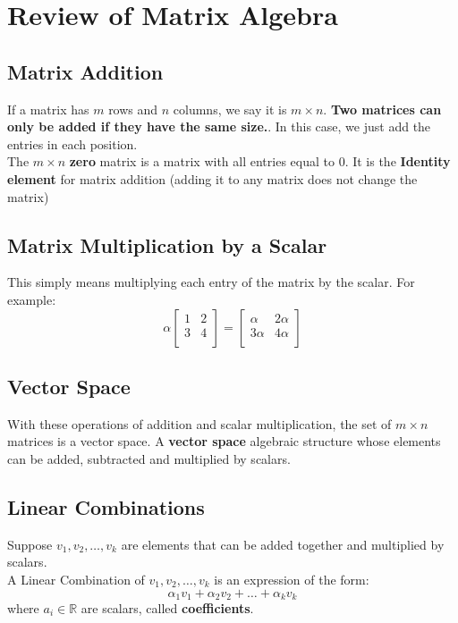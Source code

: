 \documentclass[a4paper, 9pt]{extarticle}
\begin{document}
\pagebreak
\footnotesize
\tableofcontents
\pagebreak
\normalsize
\section{Review of Matrix Algebra}
\subsection*{Matrix Addition}
If a matrix has $m$ rows and $n$ columns, we say it is $m \times n$. \textbf{Two matrices can only be added if they have the same size.}. In this case, we just add the entries in each position. \\[1.5ex]
The $m \times n$ \textbf{zero} matrix is a matrix with all entries equal to $0$. It is the \textbf{Identity element} for matrix addition (adding it to any matrix does not change the matrix)
\subsection*{Matrix Multiplication by a Scalar}
This simply means multiplying each entry of the matrix by the scalar. For example:
$$
  \alpha \begin{bmatrix}
    1 & 2 \\
    3 & 4 \\
  \end{bmatrix}
  =
  \begin{bmatrix}
    \alpha  & 2\alpha \\
    3\alpha & 4\alpha \\
  \end{bmatrix}
$$
\subsection*{Vector Space}
With these operations of addition and scalar multiplication, the set of
$m \times n$ matrices is a vector space. A \textbf{vector space} algebraic structure whose elements can be added, subtracted and multiplied by scalars.

\subsection*{Linear Combinations}
Suppose $v_1, v_2, \dots, v_k$ are elements that can be added together and multiplied by scalars. \\[2ex]
A Linear Combination of $v_1, v_2, \dots, v_k$ is an expression of the form:
$$
  \alpha_1 v_1 + \alpha_2 v_2 + \ldots + \alpha_k v_k
$$
where $a_i \in \mathbb{R}$ are scalars, called \textbf{coefficients}.
\end{document}
